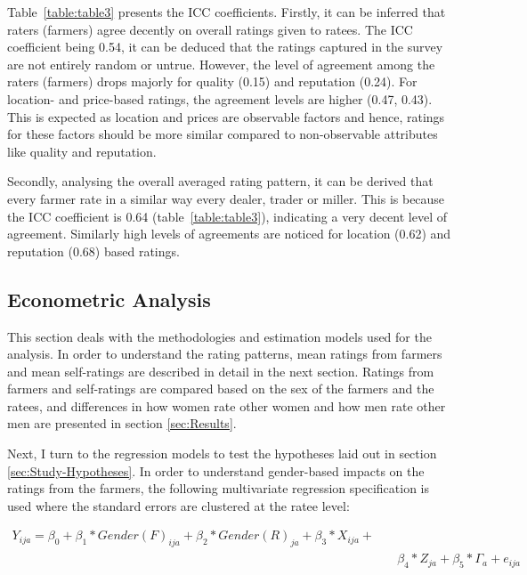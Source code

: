 \documentclass[12pt,english]{article}\usepackage[]{graphicx}\usepackage[]{color}
\begin{document}
Table~\ref{table:table3} presents the ICC coefficients. Firstly,
it can be inferred that raters (farmers) agree decently on overall
ratings given to ratees. The ICC coefficient being 0.54,
it can be deduced that the ratings captured in the survey are not
entirely random or untrue. However, the level of agreement among the
raters (farmers) drops majorly for quality (0.15)
and reputation (0.24).
For location- and price-based ratings, the agreement levels are higher
(0.47,
0.43).
This is expected as location and prices are observable factors and
hence, ratings for these factors should be more similar compared to
non-observable attributes like quality and reputation. 

\begin{onehalfspace}
Secondly, analysing the overall averaged rating pattern, it can be
derived that every farmer rate in a similar way every dealer, trader
or miller. This is because the ICC coefficient is 0.64
(table~\ref{table:table3}), indicating a very decent level of agreement.
Similarly high levels of agreements are noticed for location (0.62)
and reputation (0.68)
based ratings. 

\newpage{}
\end{onehalfspace}
\begin{onehalfspace}

\section{Econometric Analysis\label{sec:Econometric-Analysis}}
\end{onehalfspace}

This section deals with the methodologies and estimation models used
for the analysis. In order to understand the rating patterns, mean
ratings from farmers and mean self-ratings are described in detail
in the next section. Ratings from farmers and self-ratings are compared
based on the sex of the farmers and the ratees, and differences in
how women rate other women and how men rate other men are presented
in section \ref{sec:Results}.

Next, I turn to the regression models to test the hypotheses laid
out in section \ref{sec:Study-Hypotheses}. In order to understand
gender-based impacts on the ratings from the farmers, the following
multivariate regression specification is used where the standard errors
are clustered at the ratee level:

\begin{singlespace}
\begin{equation} \label{eqn:eqn1} 
\begin{array}{l}
Y_{ija} = \beta_0 + \beta_1*Gender(F)_{ija} + \beta_2*Gender(R)_{ja} + \beta_3*X_{ija} + \\ &\quad \beta_4*Z_{ja} + \beta_5*\Gamma_{a} + e_{ija} 
\end{array}
\end{equation}
\end{singlespace}
\end{document}

